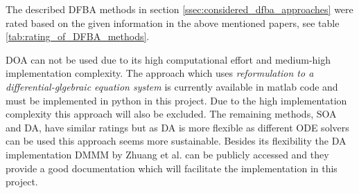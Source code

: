The described DFBA methods in section \ref{ssec:considered_dfba_approaches} were rated based on the given information in the above mentioned
papers, see table \ref{tab:rating_of_DFBA_methods}.

DOA can not be used due to its high computational effort and medium-high implementation complexity. The approach which uses
\textit{reformulation to a differential-glgebraic equation system} is currently available in matlab code and must be implemented
in python in this project. Due to the high implementation complexity this approach will also be excluded.
The remaining methods, SOA and DA, have similar ratings but as DA is more flexible as different ODE solvers can be used this approach
seems more sustainable. Besides its flexibility the DA implementation DMMM by Zhuang et al. \cite{zhuang_design_2012} can be publicly
accessed and they provide a good documentation which will facilitate the implementation in this project.

